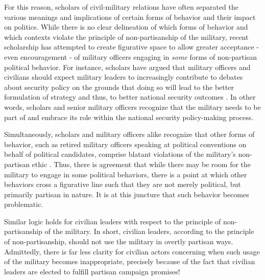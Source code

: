 \documentclass[
  12pt,
  oneside]{memoir}
\begin{document}
For this reason, scholars of civil-military relations have often separated the various meanings and implications of certain forms of behavior and their impact on politics. While there is no clear delineation of which forms of behavior and which contexts violate the principle of non-partisanship of the military, recent scholarship has attempted to create figurative space to allow greater acceptance - even encouragement - of military officers engaging in \emph{some} forms of non-partisan political behavior. For instance, scholars have argued that military officers and civilians should expect military leaders to increasingly contribute to debates about security policy on the grounds that doing so will lead to the better formulation of strategy and thus, to better national security outcomes \autocite{brooks_perils_2013,owens_military_2015,rapp_civil-military_2015}. In other words, scholars and senior military officers recognize that the military needs to be part of and embrace its role within the national security policy-making process.

Simultaneously, scholars and military officers alike recognize that other forms of behavior, such as retired military officers speaking at political conventions on behalf of political candidates, comprise blatant violations of the military's non-partisan ethic \autocite{dempsey_military_2016}. Thus, there is agreement that while there may be room for the military to engage in some political behaviors, there is a point at which other behaviors cross a figurative line such that they are not merely political, but primarily partisan in nature. It is at this juncture that such behavior becomes problematic.

Similar logic holds for civilian leaders with respect to the principle of non-partisanship of the military. In short, civilian leaders, according to the principle of non-partisanship, should not use the military in overtly partisan ways. Admittedly, there is far less clarity for civilian actors concerning when such usage of the military becomes inappropriate, precisely because of the fact that civilian leaders are elected to fulfill partisan campaign promises!
\end{document}
